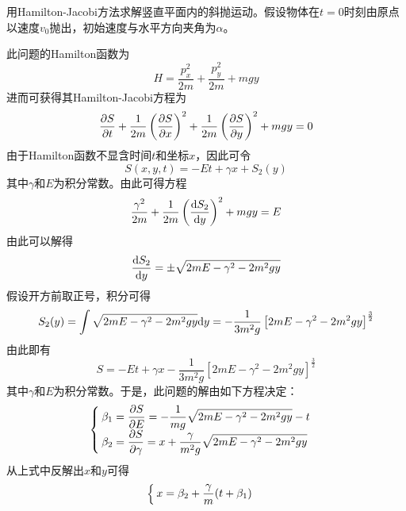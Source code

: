 \begin{question}
用Hamilton-Jacobi方法求解竖直平面内的斜抛运动。假设物体在$t=0$时刻由原点以速度$v_0$抛出，初始速度与水平方向夹角为$\alpha$。
\end{question}
\begin{solution}
此问题的Hamilton函数为
\begin{equation*}
	H = \frac{p_x^2}{2m}+\frac{p_y^2}{2m}+mgy
\end{equation*}
进而可获得其Hamilton-Jacobi方程为
\begin{equation*}
	\frac{\partial S}{\partial t} + \frac{1}{2m}\left(\frac{\partial S}{\partial x}\right)^2 + \frac{1}{2m}\left(\frac{\partial S}{\partial y}\right)^2 + mgy = 0
\end{equation*}
由于Hamilton函数不显含时间$t$和坐标$x$，因此可令
\begin{equation*}
	S(x,y,t) = -Et+\gamma x+S_2(y)
\end{equation*}
其中$\gamma$和$E$为积分常数。由此可得方程
\begin{equation*}
	\frac{\gamma^2}{2m} + \frac{1}{2m}\left(\frac{\mathrm{d} S_2}{\mathrm{d} y}\right)^2 + mgy = E
\end{equation*}
由此可以解得
\begin{equation*}
	\frac{\mathrm{d} S_2}{\mathrm{d} y} = \pm \sqrt{2mE-\gamma^2-2m^2gy}
\end{equation*}
假设开方前取正号，积分可得
\begin{equation*}
	S_2(y) = \int \sqrt{2mE-\gamma^2-2m^2gy} \mathrm{d} y = -\frac{1}{3m^2g}\left[2mE-\gamma^2-2m^2gy\right]^{\frac32}
\end{equation*}
由此即有
\begin{equation*}
	S = -Et + \gamma x - \frac{1}{3m^2g}\left[2mE-\gamma^2-2m^2gy\right]^{\frac32}
\end{equation*}
其中$\gamma$和$E$为积分常数。于是，此问题的解由如下方程决定：
\begin{equation*}
\begin{cases}
	\displaystyle \beta_1 = \frac{\partial S}{\partial E} = -\frac{1}{mg} \sqrt{2mE-\gamma^2-2m^2gy} - t \\
	\displaystyle \beta_2 = \frac{\partial S}{\partial \gamma} = x + \frac{\gamma}{m^2g}\sqrt{2mE-\gamma^2-2m^2gy}
\end{cases}
\end{equation*}
从上式中反解出$x$和$y$可得
\begin{equation*}
\begin{cases}
	\displaystyle x = \beta_2 +\frac{\gamma}{m}(t+\beta_1) \\

\end{cases}
\end{equation*}
\end{solution}
